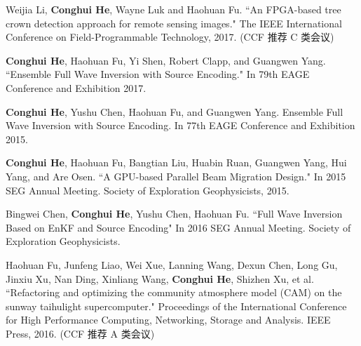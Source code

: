 \begin{resume}
\begin{publications}
   
  \end{publications}


  \begin{publications}
        \item Weijia Li, \textbf{Conghui He}, Wayne Luk and Haohuan Fu. ``An FPGA-based tree crown detection approach for remote sensing images." The IEEE International Conference on Field-Programmable Technology, 2017. (CCF 推荐 C 类会议)

 \item \textbf{Conghui He}, Haohuan Fu, Yi Shen, Robert Clapp, and Guangwen Yang. ``Ensemble Full Wave Inversion with Source Encoding." In 79th EAGE Conference and Exhibition 2017. 

    \item \textbf{Conghui He}, Yushu Chen, Haohuan Fu, and Guangwen Yang. Ensemble Full Wave Inversion with Source Encoding. In 77th EAGE Conference and Exhibition 2015.

    \item \textbf{Conghui He}, Haohuan Fu, Bangtian Liu, Huabin Ruan, Guangwen Yang, Hui Yang, and Are Osen. ``A GPU-based Parallel Beam Migration Design." In 2015 SEG Annual Meeting. Society of Exploration Geophysicists, 2015.

    \item Bingwei Chen, \textbf{Conghui He}, Yushu Chen, Haohuan Fu. ``Full Wave Inversion Based on EnKF and Source Encoding" In 2016 SEG Annual Meeting. Society of Exploration Geophysicists.

    \item Haohuan Fu, Junfeng Liao, Wei Xue, Lanning Wang, Dexun Chen, Long Gu, Jinxiu Xu, Nan Ding, Xinliang Wang, \textbf{Conghui He}, Shizhen Xu, et al. ``Refactoring and optimizing the community atmosphere model (CAM) on the sunway taihulight supercomputer." Proceedings of the International Conference for High Performance Computing, Networking, Storage and Analysis. IEEE Press, 2016. (CCF 推荐 A 类会议)


\end{publications}
\end{resume}
